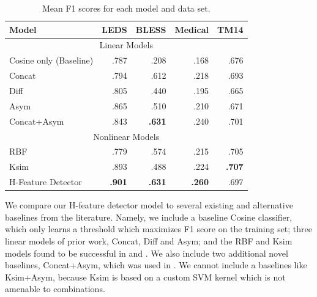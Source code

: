 \documentclass[12pt]{article}
\begin{document}
\begin{table}
\centering
\begin{small}
\begin{tabular}{|l|rrrr|}
  \hline
  Model            &      LEDS   &      BLESS  &      Medical  &      TM14   \\
  \hline
  \hline
  \multicolumn{5}{|c|}{Linear Models}\\
  \hline
  Cosine only (Baseline)              &      .787   &      .208   &      .168     &      .676   \\
  Concat                              &      .794   &      .612   &      .218     &      .693   \\
  Diff \cite{weeds:2014:coling}       &      .805   &      .440   &      .195     &      .665   \\
  Asym \cite{roller:2014:coling}      &      .865   &      .510   &      .210     &      .671   \\
  Concat+Asym \cite{beltagy:2016:cl}  &      .843   &  {\bf.631}  &      .240     &      .701   \\
  \hline
  \multicolumn{5}{|c|}{Nonlinear Models}\\
  \hline
  RBF                                         &      .779   &      .574   &      .215     &      .705   \\
  Ksim \cite{levy:2014:conll}                 &      .893   &      .488   &      .224     &  {\bf.707}  \\
  H-Feature Detector \cite{roller:2016:emnlp} &  {\bf.901}  &  {\bf.631}  &  {\bf.260}    &      .697   \\
  \hline
\end{tabular}
\end{small}
\caption{Mean F1 scores for each model and data set.}
\label{tab:hfeatureresults}
\end{table}

We compare our H-feature detector model to several existing and alternative
baselines from the literature. Namely, we include a baseline Cosine classifier,
which only learns a threshold which maximizes F1 score on the training set;
three linear models of prior work, Concat, Diff and Asym; and the RBF and Ksim
models found to be successful in  and
. We also include two additional novel baselines,
Concat+Asym, which was used in . We cannot include a
baselines like Ksim+Asym, because Ksim is based on a custom SVM kernel which is
not amenable to combinations.
\end{document}
